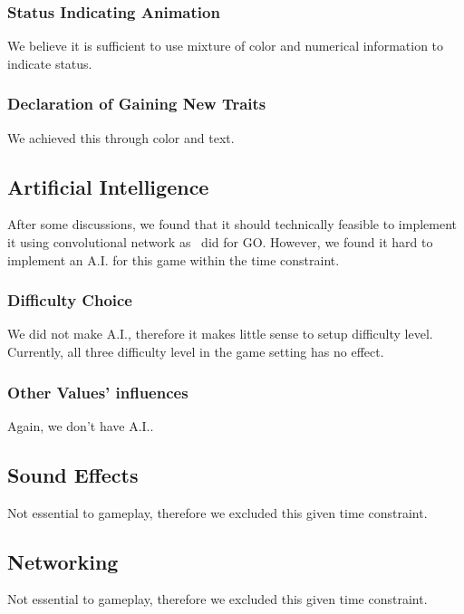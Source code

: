 \subsubsection{Status Indicating Animation}
We believe it is sufficient to use mixture of color and numerical information to indicate status.

\subsubsection{Declaration of Gaining New Traits}
We achieved this through color and text.

\subsection{Artificial Intelligence}
After some discussions, we found that it should technically feasible to implement it using convolutional network as~\cite{ClarkS14} did for GO.
However, we found it hard to implement an A.I. for this game within the time constraint. 

\subsubsection{Difficulty Choice}
We did not make A.I., therefore it makes little sense to setup difficulty level. Currently, all three difficulty level in the game setting has no effect.

\subsubsection{Other Values' influences}
Again, we don't have A.I..

	\subsection{Sound Effects}
	Not essential to gameplay, therefore we excluded this given time constraint.
	
	\subsection{Networking}
		Not essential to gameplay, therefore we excluded this given time constraint.
	